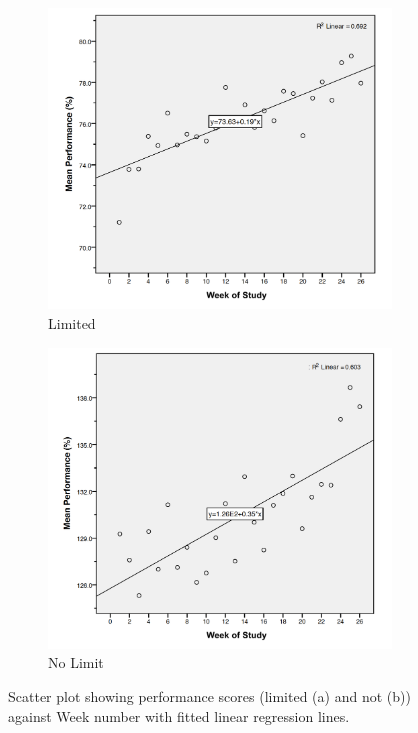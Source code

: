 \begin{figure}[h]
    \centering
    \begin{subfigure}[t]{0.48\textwidth}
        \centering
        \includegraphics[width=\textwidth]{Files/prevention-study-3/figures/performance-linear-limit}
        \caption{Limited}
        \label{fig: performance-linear-limit}
    \end{subfigure}
    \hfill
    \begin{subfigure}[t]{0.48\textwidth}
        \centering
        \includegraphics[width=\textwidth]{Files/prevention-study-3/figures/performance-linear-nolimit}
        \caption{No Limit}
        \label{fig: performance-linear-nolimit}
    \end{subfigure}
    \caption{Scatter plot showing performance scores (limited (a) and not (b)) against Week number with fitted linear regression lines.}
    \label{fig: performance-linear-limitcomparison}
\end{figure}

